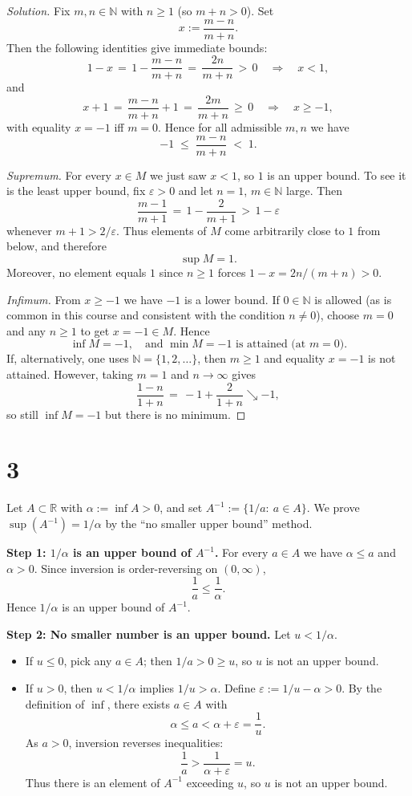 \documentclass[12pt,a4paper]{article}
\theoremstyle{definition}
\theoremstyle{remark}
\begin{document}
\begin{proof}[Solution]
Fix $m,n\in\mathbb{N}$ with $n\ge 1$ (so $m+n>0$). Set
\[
x := \frac{m-n}{m+n}.
\]
Then the following identities give immediate bounds:
\[
1 - x \,=\, 1 - \frac{m-n}{m+n} \,=\, \frac{2n}{m+n} \,>\, 0 \quad\Rightarrow\quad x<1,
\]
and
\[
x + 1 \,=\, \frac{m-n}{m+n} + 1 \,=\, \frac{2m}{m+n} \,\ge\, 0 \quad\Rightarrow\quad x\ge -1,
\]
with equality $x=-1$ iff $m=0$. Hence for all admissible $m,n$ we have
\[
-1 \;\le\; \frac{m-n}{m+n} \;<\; 1.
\]

\medskip
\noindent\textit{Supremum.} For every $x\in M$ we just saw $x<1$, so $1$ is an upper bound. To see it is the least upper bound, fix $\varepsilon>0$ and let $n=1$, $m\in\mathbb{N}$ large. Then
\[
\frac{m-1}{m+1} \,=\, 1 - \frac{2}{m+1} \,>\, 1 - \varepsilon
\]
whenever $m+1 > 2/\varepsilon$. Thus elements of $M$ come arbitrarily close to $1$ from below, and therefore
\[
\sup M = 1.
\]
Moreover, no element equals $1$ since $n\ge 1$ forces $1-x=2n/(m+n)>0$.

\medskip
\noindent\textit{Infimum.} From $x\ge -1$ we have $-1$ is a lower bound. If $0\in\mathbb{N}$ is allowed (as is common in this course and consistent with the condition $n\ne 0$), choose $m=0$ and any $n\ge 1$ to get $x=-1\in M$. Hence
\[
\inf M = -1,\quad \text{and }\min M = -1 \text{ is attained (at }m=0\text{)}.
\]
If, alternatively, one uses $\mathbb{N}=\{1,2,\dots\}$, then $m\ge 1$ and equality $x=-1$ is not attained. However, taking $m=1$ and $n\to\infty$ gives
\[
\frac{1-n}{1+n} \,=\, -1 + \frac{2}{1+n} \searrow -1,
\]
so still $\inf M=-1$ but there is no minimum.
\end{proof}


\section*{3}
Let $A\subset\mathbb{R}$ with $\alpha:=\inf A>0$, and set $A^{-1}:=\{1/a:\ a\in A\}$. We prove $\sup(A^{-1})=1/\alpha$ by the “no smaller upper bound” method.

\textbf{Step 1: $1/\alpha$ is an upper bound of $A^{-1}$.}
For every $a\in A$ we have $\alpha\le a$ and $\alpha>0$. Since inversion is order-reversing on $(0,\infty)$,
\[
\frac{1}{a}\le \frac{1}{\alpha}.
\]
Hence $1/\alpha$ is an upper bound of $A^{-1}$.

\textbf{Step 2: No smaller number is an upper bound.}
Let $u<1/\alpha$. 
\begin{itemize}
  \item If $u\le 0$, pick any $a\in A$; then $1/a>0\ge u$, so $u$ is not an upper bound.
  \item If $u>0$, then $u<1/\alpha$ implies $1/u>\alpha$. Define $\varepsilon:=1/u-\alpha>0$. By the definition of $\inf$, there exists $a\in A$ with
  \[
  \alpha\le a<\alpha+\varepsilon=\frac{1}{u}.
  \]
  As $a>0$, inversion reverses inequalities:
  \[
  \frac{1}{a}>\frac{1}{\alpha+\varepsilon}=u.
  \]
  Thus there is an element of $A^{-1}$ exceeding $u$, so $u$ is not an upper bound.
\end{itemize}
\end{document}
